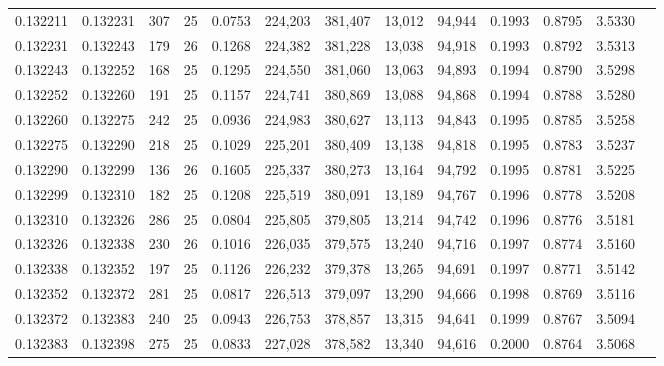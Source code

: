 \begin{tabular}{rrrrrrrrrrrrr}
0.132211 & 0.132231 &   307 &  25 &                                     0.0753 & 224,203 & 381,407 &  13,012 &  94,944 & 0.1993 & 0.8795 & 3.5330 \\
0.132231 & 0.132243 &   179 &  26 &                                     0.1268 & 224,382 & 381,228 &  13,038 &  94,918 & 0.1993 & 0.8792 & 3.5313 \\
0.132243 & 0.132252 &   168 &  25 &                                     0.1295 & 224,550 & 381,060 &  13,063 &  94,893 & 0.1994 & 0.8790 & 3.5298 \\
0.132252 & 0.132260 &   191 &  25 &                                     0.1157 & 224,741 & 380,869 &  13,088 &  94,868 & 0.1994 & 0.8788 & 3.5280 \\
0.132260 & 0.132275 &   242 &  25 &                                     0.0936 & 224,983 & 380,627 &  13,113 &  94,843 & 0.1995 & 0.8785 & 3.5258 \\
0.132275 & 0.132290 &   218 &  25 &                                     0.1029 & 225,201 & 380,409 &  13,138 &  94,818 & 0.1995 & 0.8783 & 3.5237 \\
0.132290 & 0.132299 &   136 &  26 &                                     0.1605 & 225,337 & 380,273 &  13,164 &  94,792 & 0.1995 & 0.8781 & 3.5225 \\
0.132299 & 0.132310 &   182 &  25 &                                     0.1208 & 225,519 & 380,091 &  13,189 &  94,767 & 0.1996 & 0.8778 & 3.5208 \\
0.132310 & 0.132326 &   286 &  25 &                                     0.0804 & 225,805 & 379,805 &  13,214 &  94,742 & 0.1996 & 0.8776 & 3.5181 \\
0.132326 & 0.132338 &   230 &  26 &                                     0.1016 & 226,035 & 379,575 &  13,240 &  94,716 & 0.1997 & 0.8774 & 3.5160 \\
0.132338 & 0.132352 &   197 &  25 &                                     0.1126 & 226,232 & 379,378 &  13,265 &  94,691 & 0.1997 & 0.8771 & 3.5142 \\
0.132352 & 0.132372 &   281 &  25 &                                     0.0817 & 226,513 & 379,097 &  13,290 &  94,666 & 0.1998 & 0.8769 & 3.5116 \\
0.132372 & 0.132383 &   240 &  25 &                                     0.0943 & 226,753 & 378,857 &  13,315 &  94,641 & 0.1999 & 0.8767 & 3.5094 \\
0.132383 & 0.132398 &   275 &  25 &                                     0.0833 & 227,028 & 378,582 &  13,340 &  94,616 & 0.2000 & 0.8764 & 3.5068 \\

\end{tabular}
